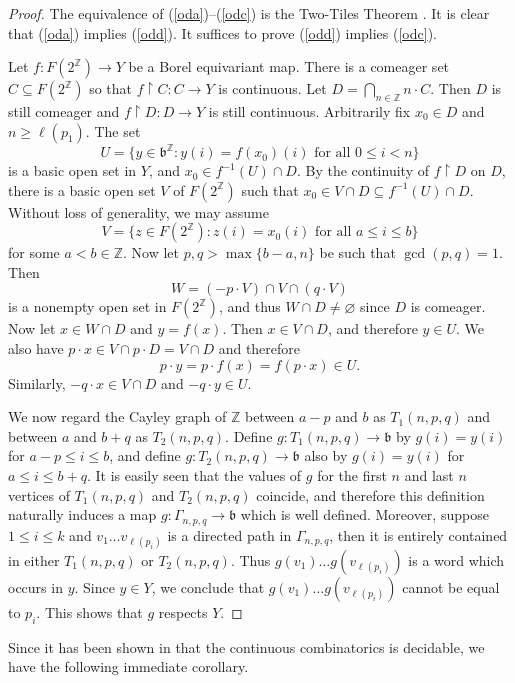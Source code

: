 \documentclass[11pt]{amsart}
\theoremstyle{definition}
\def\Z{\mathbb{Z}}
\def\Z{\mathbb{Z}}
\def\bsft{\mathfrak{b}}
\begin{document}
\begin{proof} The equivalence of (\ref{oda})--(\ref{odc}) is the Two-Tiles Theorem \cite[Theorem 2.2.2]{GJKS}. It is clear that (\ref{oda}) implies (\ref{odd}). It suffices to prove (\ref{odd}) implies (\ref{odc}).

Let $f\colon F(2^\Z)\to Y$ be a Borel equivariant map. There is a comeager set $C\subseteq F(2^\Z)$ so that $f\upharpoonright C\colon C\to Y$ is continuous. Let $D=\bigcap_{n\in\Z} n\cdot C$. Then $D$ is still comeager and $f\upharpoonright D\colon D\to Y$ is still continuous. Arbitrarily fix $x_0\in D$ and $n\geq \ell(p_1)$. The set
$$ U=\{ y\in \bsft^\Z\colon y(i)=f(x_0)(i) \mbox{ for all $0\leq i<n$}\} $$
is a basic open set in $Y$, and $x_0\in f^{-1}(U)\cap D$. By the continuity of $f\upharpoonright D$ on $D$, there is a basic open set $V$ of $F(2^\Z)$ such that $x_0\in V\cap D\subseteq f^{-1}(U)\cap D$. Without loss of generality, we may assume 
$$ V=\{z\in F(2^\Z)\colon z(i)=x_0(i) \mbox{ for all $a\leq i\leq b$}\} $$
for some $a<b\in \Z$. Now let $p, q>\max\{b-a, n\}$ be such that $\gcd(p,q)=1$. Then
$$ W=(-p\cdot V)\cap V\cap (q\cdot V) $$
is a nonempty open set in $F(2^\Z)$, and thus $W\cap D\neq\varnothing$ since $D$ is comeager. Now let $x\in W\cap D$ and $y=f(x)$. Then $x\in V\cap D$, and therefore $y\in U$. We also have $p\cdot x\in V\cap p\cdot D=V\cap D$ and therefore $$p\cdot y=p\cdot f(x)=f(p\cdot x)\in U. $$
Similarly, $-q\cdot x\in V\cap D$ and $-q\cdot y\in U$.

We now regard the Cayley graph of $\Z$ between $a-p$ and $b$ as $T_1(n,p,q)$ and between $a$ and $b+q$ as $T_2(n,p,q)$. Define $g\colon T_1(n, p,q)\to \bsft$ by $g(i)=y(i)$ for $a-p\leq i\leq b$, and define
$g\colon T_2(n,p,q)\to \bsft$ also by $g(i)=y(i)$ for $a\leq i\leq b+q$. It is easily seen that the values of $g$ for the first $n$ and last $n$ vertices of $T_1(n,p,q)$ and $T_2(n,p,q)$ coincide, and therefore this definition naturally induces a map $g\colon \Gamma_{n,p,q}\to \bsft$ which is well defined. Moreover, suppose $1\leq i\leq k$ and $v_1\dots v_{\ell(p_i)}$ is a directed path in $\Gamma_{n,p,q}$, then it is entirely contained in either $T_1(n,p,q)$ or $T_2(n,p,q)$. Thus $g(v_1)\dots g(v_{\ell(p_i)})$ is a word which occurs in $y$. Since $y\in Y$, we conclude that $g(v_1)\dots g(v_{\ell(p_i)})$ cannot be equal to $p_i$. This shows that $g$ respects $Y$. 
\end{proof}

Since it has been shown in \cite[Theorem 4.2.1]{GJKS} that the continuous combinatorics is decidable, we have the following immediate corollary.
\end{document}
